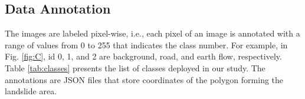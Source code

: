 \documentclass{ieeeaccess}
\begin{document}

\subsection{Data Annotation}
The images are labeled pixel-wise, i.e., each pixel of an image is annotated with a range of values from 0 to 255 that indicates the class number. For example, in Fig. \ref{fig:C}, id 0, 1, and 2 are background, road, and earth flow, respectively. Table \ref{tab:classes} presents the list of classes deployed in our study. The annotations are JSON files that store coordinates of the polygon forming the landslide area. 
\end{document}
